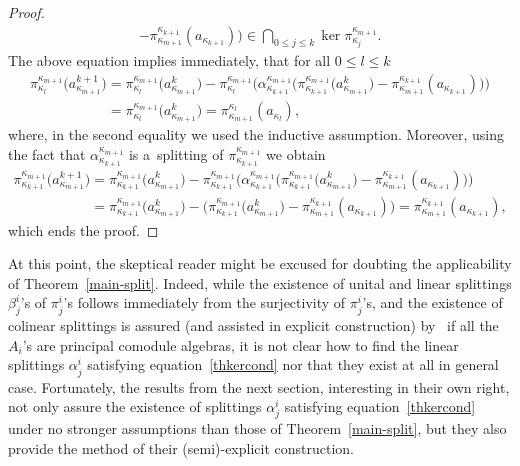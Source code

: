 \begin{proof}
\begin{gather*}
-\pi^{\kappa_{k+1}}_{\kappa_{m+1}}(a_{\kappa_{k+1}})
\big)\in \bigcap_{0\leq j\leq k}\ker\pi^{\kappa_{m+1}}_{\kappa_j}.
\end{gather*}
The above equation implies immediately, that for all $0\leq l\leq k$
\begin{gather*}
\pi^{\kappa_{m+1}}_{\kappa_l}\big(a^{k+1}_{\kappa_{m+1}}\big)
= \pi^{\kappa_{m+1}}_{\kappa_l}\big(a_{\kappa_{m+1}}^k\big)-\pi^{\kappa_{m+1}}_{\kappa_l}\big(\alpha^{\kappa_{m+1}}_{\kappa_{k+1}}
\big(\pi^{\kappa_{m+1}}_{\kappa_{k+1}}\big(a^k_{\kappa_{m+1}}\big)-\pi^{\kappa_{k+1}}_{\kappa_{m+1}}(a_{\kappa_{k+1}})\big)\big)
\\
\phantom{\pi^{\kappa_{m+1}}_{\kappa_l}\big(a^{k+1}_{\kappa_{m+1}}\big)}{}
 =\pi^{\kappa_{m+1}}_{\kappa_l}\big(a_{\kappa_{m+1}}^k\big)
 =\pi^{\kappa_l}_{\kappa_{m+1}}(a_{\kappa_l}),
\end{gather*}
where, in the second equality we used the inductive assumption.
Moreover, using the fact that $\alpha^{\kappa_{m+1}}_{\kappa_{k+1}}$ is a~splitting of
$\pi^{\kappa_{m+1}}_{\kappa_{k+1}}$ we obtain
\begin{gather*}
\pi^{\kappa_{m+1}}_{\kappa_{k+1}}\big(a^{k+1}_{\kappa_{m+1}}\big)
= \pi^{\kappa_{m+1}}_{\kappa_{k+1}}\big(a_{\kappa_{m+1}}^k\big)-\pi^{\kappa_{m+1}}_{\kappa_{k+1}}\big(\alpha^{\kappa_{m+1}}_{\kappa_{k+1}}
\big(\pi^{\kappa_{m+1}}_{\kappa_{k+1}}\big(a^k_{\kappa_{m+1}}\big)-\pi^{\kappa_{k+1}}_{\kappa_{m+1}}(a_{\kappa_{k+1}})\big)\big)
\\
\phantom{\pi^{\kappa_{m+1}}_{\kappa_{k+1}}\big(a^{k+1}_{\kappa_{m+1}}\big)}
 =\pi^{\kappa_{m+1}}_{\kappa_{k+1}}\big(a_{\kappa_{m+1}}^k\big) -
\big(\pi^{\kappa_{m+1}}_{\kappa_{k+1}}\big(a^k_{\kappa_{m+1}}\big)-\pi^{\kappa_{k+1}}_{\kappa_{m+1}}(a_{\kappa_{k+1}})\big)
 =\pi^{\kappa_{k+1}}_{\kappa_{m+1}}(a_{\kappa_{k+1}}),
\end{gather*}
which ends the proof.
\end{proof}

At this point, the skeptical reader might be excused for doubting the applicability of Theorem~\ref{main-split}.
Indeed, while the existence of unital and linear splittings $\beta^i_j$'s of $\pi^i_j$'s follows immediately from the
surjectivity of $\pi^i_j$'s, and the existence of colinear splittings is assured (and assisted in explicit construction)
by~\cite[Lemma~3.1]{hkmz11} if all the $A_i$'s are principal comodule algebras, it is not clear how to f\/ind the linear
splittings $\alpha^i_j$ satisfying equation~\eqref{thkercond} nor that they exist at all in general case.
Fortunately, the results from the next section, interesting in their own right, not only assure the existence of
splittings $\alpha^i_j$ satisfying equation~\eqref{thkercond} under no stronger assumptions than those of
Theorem~\ref{main-split}, but they also provide the method of their (semi)-explicit construction.

